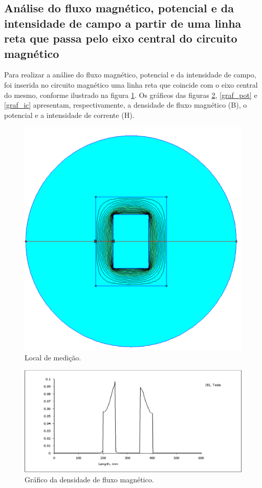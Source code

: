 \subsection{Análise do fluxo magnético, potencial e da intensidade de campo a partir de uma linha reta que passa pelo eixo central do circuito magnético}

Para realizar a análise do fluxo magnético, potencial e da intensidade de campo, foi inserida no circuito magnético uma linha reta que coincide com o eixo central do mesmo, conforme ilustrado na figura \ref{loc_med}. Os gráficos das figuras \ref{graf_dfm}, \ref{graf_pot} e \ref{graf_ic} apresentam, respectivamente, a densidade de fluxo magnético (B), o potencial e a intensidade de corrente (H).

\begin{figure}[H]
\centering
\includegraphics[scale=0.65]{img/assig1/linha_1.png}
\caption[Local de medição]{Local de medição.}
\label{loc_med}
\end{figure}

\begin{figure}[H]
\centering
\includegraphics[scale=0.3]{img/assig1/linha_B.png}
\caption[Gráfico da densidade de fluxo magnético]{Gráfico da densidade de fluxo magnético.}
\label{graf_dfm}
\end{figure}


